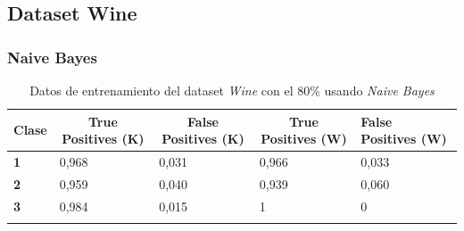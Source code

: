 \documentclass[10pt,a4paper]{article}
\begin{document}
\newpage
\subsection{Dataset Wine}

\subsubsection{Naive Bayes}
\begin{table}[h!]
	\begin{tabular}{lllll}
		\hline
		\multicolumn{1}{|c|}{\textbf{Clase}} & \multicolumn{1}{c|}{\textbf{True Positives (K)}} & \multicolumn{1}{c|}{\textbf{False Positives (K)}} & \multicolumn{1}{c|}{\textbf{True Positives (W)}} & \multicolumn{1}{l|}{\textbf{False Positives (W)}} \\ \hline
		\multicolumn{1}{|l|}{\textbf{1}} & \multicolumn{1}{l|}{0,968}          & \multicolumn{1}{l|}{0,031}          & \multicolumn{1}{l|}{0,966}          & \multicolumn{1}{l|}{0,033} \\ \hline
		\multicolumn{1}{|l|}{\textbf{2}} & \multicolumn{1}{l|}{0,959}          & \multicolumn{1}{l|}{0,040}          & \multicolumn{1}{l|}{0,939}          & \multicolumn{1}{l|}{0,060} \\ \hline
		\multicolumn{1}{|l|}{\textbf{3}} & \multicolumn{1}{l|}{0,984}          & \multicolumn{1}{l|}{0,015}          & \multicolumn{1}{l|}{1}          & \multicolumn{1}{l|}{0}\\ \hline
		\textbf{}                       &                                &                                &                                &                      
 
	\end{tabular}
	\caption{Datos de entrenamiento del dataset \emph{Wine} con el 80\% usando \emph{Naive Bayes}}
	\label{tab:wine_bayes_80}
\end{table}
\end{document}
